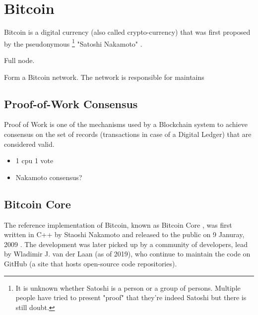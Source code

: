 
\newpage
\section{Bitcoin} \label{intro-bitcoin}

Bitcoin is a digital currency (also called crypto-currency) that was first proposed by the pseudonymous \footnote{It is unknown whether Satoshi is a person or a group of persons. Multiple people have tried to present "proof" that they're indeed Satoshi but there is still doubt.} "Satoshi Nakamoto" \cite{bitcoinOriginal}. 

Full node.

Form a Bitcoin network. The network is responsible for maintains 


\newpage
\subsection{Proof-of-Work Consensus} \label{btc-pow}

Proof of Work is one of the mechanisms used by a Blockchain system to achieve consensus on the set of records (transactions in case of a Digital Ledger) that are considered valid. 

\begin{itemize}
    \item 1 cpu 1 vote
    \item Nakamoto consensus?
\end{itemize}


\newpage
\subsection{Bitcoin Core} \label{btc-arch}

The reference implementation of Bitcoin, known as Bitcoin Core \cite{bitcoinGithub}, was first written in C++ by Staoshi Nakamoto and released to the public on 9 Januray, 2009 \cite{bitcoinCoreWiki}. The development was later picked up by a community of developers, lead by Wladimir J. van der Laan (as of 2019), who continue to maintain the code on GitHub (a site that hosts open-source code repositories). 

